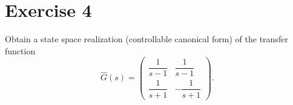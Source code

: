 \documentclass[12pt,a4paper]{article}
\begin{document}
% 
% 
% 
% 
% 
\section*{Exercise 4}
Obtain a state space realization (controllable canonical form) of the transfer
function
\[
\hat G(s)=
\begin{pmatrix}
\dfrac{1}{s-1} & \dfrac{1}{s-1} \\[8pt]
\dfrac{1}{s+1} & -\dfrac{1}{s+1}
\end{pmatrix}.
\]
\end{document}
